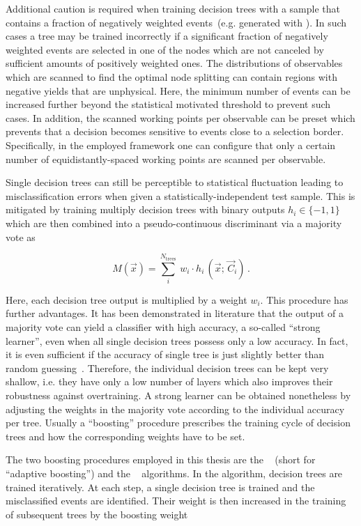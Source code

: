 Additional caution is required when training decision trees with a sample that contains a fraction of negatively weighted events~(e.g. generated with \MGAMC). In such cases a tree may be trained incorrectly if a significant fraction of negatively weighted events are selected in one of the nodes which are not canceled by sufficient amounts of positively weighted ones. The distributions of observables which are scanned to find the optimal node splitting can contain regions with negative yields that are unphysical. Here, the minimum number of events can be increased further beyond the statistical motivated threshold to prevent such cases. In addition, the scanned working points per observable can be preset which prevents that a decision becomes sensitive to events close to a selection border. Specifically, in the employed \TMVA framework one can configure that only a certain number of equidistantly-spaced working points are scanned per observable.
 
Single decision trees can still be perceptible to statistical fluctuation leading to misclassification errors when given a statistically-independent test sample. This is mitigated by training multiply decision trees with binary outputs $h_{i}\in\{-1,1\}$ which are then combined into a pseudo-continuous discriminant via a majority vote as

\begin{equation}
M(\vec{x})=\sum_{i}^{N_\mathrm{trees}}~w_{i}\cdot h_{i}\,(\vec{x};\,\vec{C}_{i})\,.\label{eq:technique-majority-vote}
\end{equation}

Here, each decision tree output is multiplied by a weight $w_{i}$. This procedure has further advantages. It has been demonstrated in literature that the output of a majority vote can yield a classifier with high accuracy, a so-called ``strong learner'', even when all single decision trees possess only a low accuracy. In fact, it is even sufficient if the accuracy of single tree is just slightly better than random guessing~\cite{Schapire1990,FREUND1995256}. Therefore, the individual decision trees can be kept very shallow, i.e. they have only a low number of layers which also improves their robustness against overtraining. A strong learner can be obtained nonetheless by adjusting the weights in the majority vote according to the individual accuracy per tree. Usually a ``boosting'' procedure prescribes the training cycle of decision trees and how the corresponding weights have to be set.

The two boosting procedures employed in this thesis are the \ADABOOST[format=hyperbf]~\cite{FREUND1997119} (short for ``adaptive boosting'') and the \GRADIENTBOOST[format=hyperbf]~\cite{Friedman00greedyfunction} algorithms. In the \ADABOOST algorithm, decision trees are trained iteratively. At each step, a single decision tree is trained and the misclassified events are identified. Their weight is then increased in the training of subsequent trees by the boosting weight

